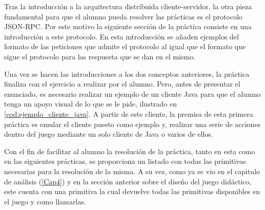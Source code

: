 Tras la introducción a la arquitectura distribuida cliente-servidor, la otra pieza fundamental para que el alumno pueda resolver las prácticas es el protocolo JSON-RPC. Por este motivo la siguiente sección de la práctica consiste en una introducción a este protocolo. En esta introducción se añaden ejemplos del formato de las peticiones que admite el protocolo al igual que el formato que sigue el protocolo para las respuesta que se dan en el mismo.

Una vez se hacen las introducciones a los dos conceptos anteriores, la práctica finaliza con el ejercicio a realizar por el alumno. Pero, antes de presentar el enunciado, es necesario realizar un ejemplo de un cliente Java para que el alumno tenga un apoyo visual de lo que se le pide, ilustrado en \ref{cod:ejemplo_cliente_java}. A partir de este cliente, la premisa de esta primera práctica es emular el cliente puesto como ejemplo y, realizar una serie de acciones dentro del juego mediante un solo cliente de Java o varios de ellos.

Con el fin de facilitar al alumno la resolución de la práctica, tanto en esta como en las siguientes prácticas, se proporciona un listado con todas las primitivas necesarias para la resolución de la misma. A su vez, como ya se vio en el capitulo de análisis (\ref{Cap4}) y en la sección anterior sobre el diseño del juego didáctico, este cuenta con una primitiva la cual devuelve todas las primitivas disponibles en el juego y como llamarlas.
\\

